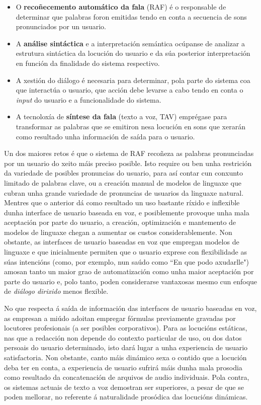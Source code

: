 \begin{multicols}{2}
\begin{itemize}
      \item O \textbf{recoñecemento automático da fala } (RAF) é o responsable de determinar que palabras foron emitidas tendo en conta a secuencia de sons pronunciados por un usuario.
      \item A \textbf{análise sintáctica } e a interpretación semántica ocúpanse de analizar a estrutura sintáctica da locución do usuario e da súa posterior interpretación en función da finalidade do sistema respectivo.
      \item A xestión do diálogo é necesaria para determinar, pola parte do sistema coa que interactúa o usuario, que acción debe levarse a cabo tendo en conta o \textit{input} do usuario e a funcionalidade do sistema.
      \item A tecnoloxía de  \textbf{síntese da fala} (texto a voz, TAV) emprégase para transformar as palabras que se emitiron nesa locución en sons que xerarán como resultado unha información de saída para o usuario.  
\end{itemize}

Un dos maiores retos é que o sistema de RAF recoñeza as palabras pronunciadas por un usuario do xeito máis preciso posible. Isto require ou ben unha restrición da variedade de posibles pronuncias do usuario, para así contar cun conxunto limitado de palabras clave, ou a creación manual de modelos de linguaxe que cubran unha grande variedade de pronuncias de usuarios da linguaxe natural. Mentres que o anterior dá como resultado un uso bastante ríxido e inflexible dunha interface de usuario baseada en voz, e posiblemente provoque unha mala aceptación por parte do usuario, a creación, optimización e mantemento de modelos de linguaxe chegan a aumentar os custos considerablemente. Non obstante, as interfaces de usuario baseadas en voz que empregan modelos de linguaxe e que inicialmente permiten que o usuario exprese con flexibilidade as súas intencións (como, por exemplo, nun saúdo como “En que podo axudarlle") amosan tanto un maior grao de automatización como unha maior aceptación por parte do usuario e, polo tanto, poden considerarse vantaxosas mesmo cun enfoque de \textit{diálogo dirixido }  menos flexible.


No que respecta á saída de información das interfaces de usuario baseadas en voz, as empresan a miúdo adoitan empregar fórmulas previamente gravadas por locutores profesionais (a ser posibles corporativos). Para as locucións estáticas, nas que a redacción non depende do contexto particular de uso, ou dos datos persoais do usuario determinado, isto dará lugar a unha experiencia de usuario satisfactoria. Non obstante, canto máis dinámico sexa o contido que a locución deba ter en conta, a experiencia de usuario sufrirá máis dunha mala prosodia como resultado da concatenación de arquivos de audio individuais. Pola contra, os sistemas actuais de texto a voz demostran ser superiores, a pesar de que se poden mellorar, no referente á naturalidade prosódica das locucións dinámicas. 


\end{multicols}
